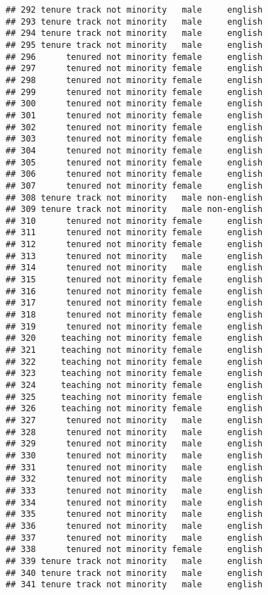 \documentclass[
]{article}
\begin{document}
\begin{verbatim}
## 292 tenure track not minority   male     english
## 293 tenure track not minority   male     english
## 294 tenure track not minority   male     english
## 295 tenure track not minority   male     english
## 296      tenured not minority female     english
## 297      tenured not minority female     english
## 298      tenured not minority female     english
## 299      tenured not minority female     english
## 300      tenured not minority female     english
## 301      tenured not minority female     english
## 302      tenured not minority female     english
## 303      tenured not minority female     english
## 304      tenured not minority female     english
## 305      tenured not minority female     english
## 306      tenured not minority female     english
## 307      tenured not minority female     english
## 308 tenure track not minority   male non-english
## 309 tenure track not minority   male non-english
## 310      tenured not minority female     english
## 311      tenured not minority female     english
## 312      tenured not minority female     english
## 313      tenured not minority   male     english
## 314      tenured not minority   male     english
## 315      tenured not minority female     english
## 316      tenured not minority female     english
## 317      tenured not minority female     english
## 318      tenured not minority female     english
## 319      tenured not minority female     english
## 320     teaching not minority female     english
## 321     teaching not minority female     english
## 322     teaching not minority female     english
## 323     teaching not minority female     english
## 324     teaching not minority female     english
## 325     teaching not minority female     english
## 326     teaching not minority female     english
## 327      tenured not minority   male     english
## 328      tenured not minority   male     english
## 329      tenured not minority   male     english
## 330      tenured not minority   male     english
## 331      tenured not minority   male     english
## 332      tenured not minority   male     english
## 333      tenured not minority   male     english
## 334      tenured not minority   male     english
## 335      tenured not minority   male     english
## 336      tenured not minority   male     english
## 337      tenured not minority   male     english
## 338      tenured not minority female     english
## 339 tenure track not minority   male     english
## 340 tenure track not minority   male     english
## 341 tenure track not minority   male     english

\end{verbatim}
\end{document}
